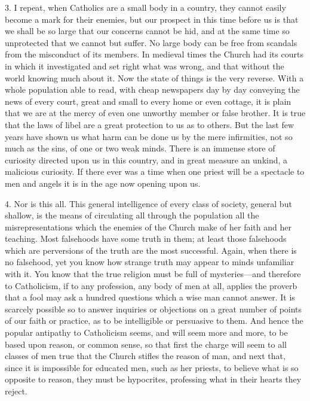 3. I repeat, when Catholics are a small body in a
country, they cannot easily become a mark for their enemies, but our
prospect in this time before us is that we shall be so large that our
concerns cannot be hid, and at the same time so unprotected that we
cannot but suffer. No large body can be free from scandals from the
misconduct of its members. In medieval times the Church had its courts
in which it investigated and set right what was wrong, and that
without the world knowing much about it. Now the state of things is
the very reverse. With a whole population able to read, with
cheap newspapers day by day conveying the news of every court, great
and small to every home or even cottage, it is plain that we are at
the mercy of even one unworthy member or false brother. It is true
that the laws of libel are a great protection to us as to others. But
the last few years have shown us what harm can be done us by the mere
infirmities, not so much as the sins, of one or two weak minds. There
is an immense store of curiosity directed upon us in this country, and
in great measure an unkind, a malicious curiosity. If there ever was a
time when one priest will be a spectacle to men and angels it is in
the age now opening upon us.

4. Nor is this all. This general intelligence of
every class of society, general but shallow, is the means of
circulating all through the population all the misrepresentations
which the enemies of the Church make of her faith and her teaching.
Most falsehoods have some truth in them; at least those falsehoods
which are perversions of the truth are the most successful. Again,
when there is no falsehood, yet you know how strange truth may appear
to minds unfamiliar with it. You know that the true religion must be
full of mysteries—and therefore to Catholicism, if to any
profession, any body of men at all, applies the proverb that a fool
may ask a hundred questions which a wise man cannot answer. It is
scarcely possible so to answer inquiries or objections on a great
number of points of our faith or practice, as to be intelligible
or persuasive to them. And hence the popular antipathy to Catholicism
seems, and will seem more and more, to be based upon reason, or common
sense, so that first the charge will seem to all classes of men true
that the Church stifles the reason of man, and next that, since it is
impossible for educated men, such as her priests, to believe what is
so opposite to reason, they must be hypocrites, professing what in
their hearts they reject.

